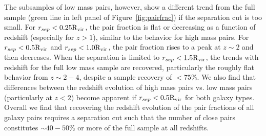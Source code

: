 \documentclass[twocolumn]{aastex631}
\newcommand{\Rvir}{\ensuremath{\rm R_{vir}}}
\begin{document}
    The subsamples of low mass pairs, however, show a different trend from the full sample (green line in left panel of Figure~\ref{fig:pairfrac}) if the separation cut is too small. 
    For $r_{sep} < 0.25\Rvir$, the pair fraction is flat or decreasing as a function of redshift (especially for $z>1$), similar to the behavior for high mass pairs. 
    For $r_{sep} < 0.5\Rvir$ and $r_{sep} < 1.0\Rvir$, the pair fraction rises to a peak at $z\sim2$ and then decreases. 
    When the separation is limited to $r_{sep} < 1.5\Rvir$, the trends with redshift for the full low mass sample are recovered, particularly the roughly flat behavior from $z\sim2-4$, despite a sample recovery of $<75\%$. 
    We also find that differences between the redshift evolution of high mass pairs vs. low mass pairs (particularly at $z<2$) become apparent if $r_{sep} < 0.5\Rvir$ for both galaxy types. 
    Overall we find that recovering the redshift evolution of the pair fractions of all galaxy pairs requires a separation cut such that the number of close pairs constitutes $\sim40-50\%$ or more of the full sample at all redshifts. 
\end{document}

